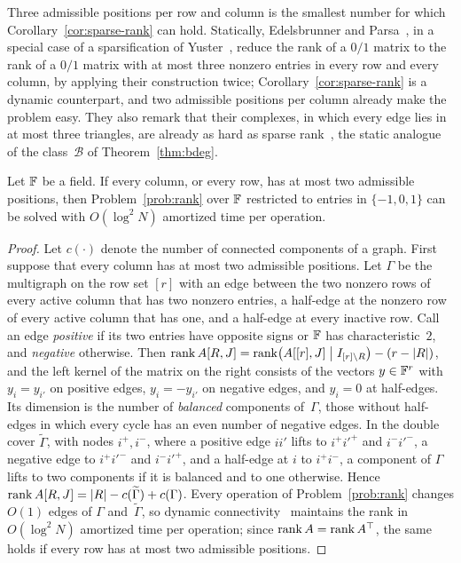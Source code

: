 Three admissible positions per row and column is the smallest number for which Corollary~\ref{cor:sparse-rank} can hold.
Statically, Edelsbrunner and Parsa~\cite[Theorem~4.1]{EP14}, in a special case of a sparsification of Yuster~\cite{Yus08}, reduce the rank of a $0/1$ matrix to the rank of a $0/1$ matrix with at most three nonzero entries in every row and every column, by applying their construction twice; Corollary~\ref{cor:sparse-rank} is a dynamic counterpart, and two admissible positions per column already make the problem easy.
They also remark that their complexes, in which every edge lies in at most three triangles, are already as hard as sparse rank~\cite[remark after Theorem~4.1]{EP14}, the static analogue of the class~$\mathcal{B}$ of Theorem~\ref{thm:bdeg}.

\begin{proposition}\label{rem:threshold}
Let $\mathbb{F}$ be a field. If every column, or every row, has at most two admissible positions, then Problem~\ref{prob:rank} over $\mathbb{F}$ restricted to entries in $\{-1,0,1\}$ can be solved with $O(\log^2N)$ amortized time per operation.
\end{proposition}

\begin{proof}
Let $c(\cdot)$ denote the number of connected components of a graph.
First suppose that every column has at most two admissible positions.
Let $\Gamma$ be the multigraph on the row set $[r]$ with an edge between the two nonzero rows of every active column that has two nonzero entries, a half-edge at the nonzero row of every active column that has one, and a half-edge at every inactive row.
Call an edge \emph{positive} if its two entries have opposite signs or $\mathbb{F}$ has characteristic~$2$, and \emph{negative} otherwise.
Then $\operatorname{rank} A[R,J]=\operatorname{rank}\bigl(A[[r],J]\;\big|\;I_{[r]\setminus R}\bigr)-(r-|R|)$, and the left kernel of the matrix on the right consists of the vectors $y\in\mathbb{F}^r$ with $y_i=y_{i'}$ on positive edges, $y_i=-y_{i'}$ on negative edges, and $y_i=0$ at half-edges.
Its dimension is the number of \emph{balanced} components of~$\Gamma$, those without half-edges in which every cycle has an even number of negative edges.
In the double cover $\widetilde\Gamma$, with nodes $i^{+},i^{-}$, where a positive edge $ii'$ lifts to $i^{+}i'^{+}$ and $i^{-}i'^{-}$, a negative edge to $i^{+}i'^{-}$ and $i^{-}i'^{+}$, and a half-edge at $i$ to $i^{+}i^{-}$, a component of $\Gamma$ lifts to two components if it is balanced and to one otherwise.
Hence $\operatorname{rank} A[R,J]=|R|-c(\widetilde\Gamma)+c(\Gamma)$.
Every operation of Problem~\ref{prob:rank} changes $O(1)$ edges of $\Gamma$ and~$\widetilde\Gamma$, so dynamic connectivity~\cite{HDT01} maintains the rank in $O(\log^2N)$ amortized time per operation; since $\operatorname{rank} A=\operatorname{rank} A^{\top}$, the same holds if every row has at most two admissible positions.
\end{proof}

